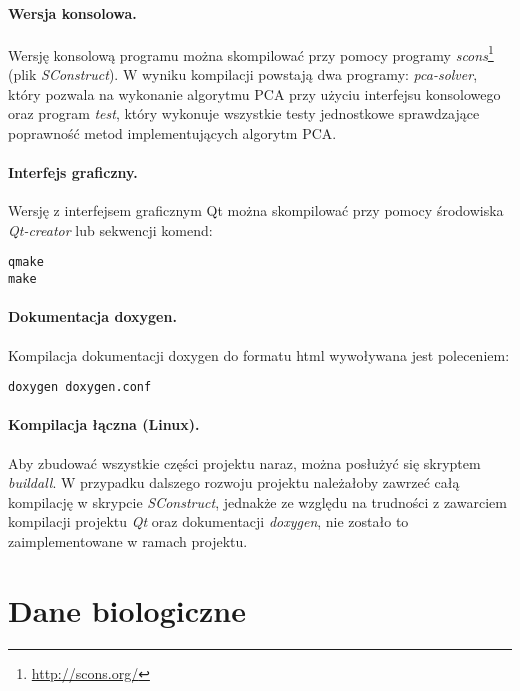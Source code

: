 \documentclass{article}
\begin{document}
\paragraph{Wersja konsolowa.}
Wersję konsolową programu można skompilować przy pomocy programy \emph{scons}\footnote{\url{http://scons.org/}} (plik \emph{SConstruct}). W wyniku kompilacji powstają dwa programy: \emph{pca-solver}, który pozwala na wykonanie algorytmu PCA przy użyciu interfejsu konsolowego oraz program \emph{test}, który wykonuje wszystkie testy jednostkowe sprawdzające poprawność metod implementujących algorytm PCA.

\paragraph{Interfejs graficzny.}
Wersję z interfejsem graficznym Qt można skompilować przy pomocy środowiska \emph{Qt-creator} lub sekwencji komend: 
\begin{verbatim}
qmake
make
\end{verbatim}

\paragraph{Dokumentacja doxygen.}
Kompilacja dokumentacji doxygen do formatu html wywoływana jest poleceniem:
\begin{verbatim}
doxygen doxygen.conf
\end{verbatim}

\paragraph{Kompilacja łączna (Linux).}
Aby zbudować wszystkie części projektu naraz, można posłużyć się skryptem \emph{buildall}. W przypadku dalszego rozwoju projektu należałoby zawrzeć całą kompilację w skrypcie \emph{SConstruct}, jednakże ze względu na trudności z zawarciem kompilacji projektu \emph{Qt} oraz dokumentacji \emph{doxygen}, nie zostało to zaimplementowane w ramach projektu.

\section{Dane biologiczne}
\end{document}
